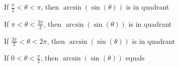 \documentclass{ximera}
\begin{document}
\begin{question}


If $\frac{\pi}{2} < \theta < \pi$, then $\arcsin(\sin(\theta))$ is in quadrant

\begin{multipleChoice}
\end{multipleChoice}

\end{question}









\begin{question}


If $\pi < \theta < \frac{3\pi}{2}$, then $\arcsin(\sin(\theta))$ is in quadrant

\begin{multipleChoice}
\end{multipleChoice}

\end{question}







\begin{question}


If $\frac{3\pi}{2} < \theta < 2\pi$, then $\arcsin(\sin(\theta))$ is in quadrant

\begin{multipleChoice}
\end{multipleChoice}

\end{question}


















\begin{question}


If $0 < \theta < \frac{\pi}{2}$, then $\arcsin(\sin(\theta))$ equals

\begin{multipleChoice}
\choice[correct] {$\theta$}
\choice {$\pi - \theta$}
\choice {$\pi + \theta$}
\choice {$\theta - 2\pi$}
\end{multipleChoice}

\end{question}
\end{document}
